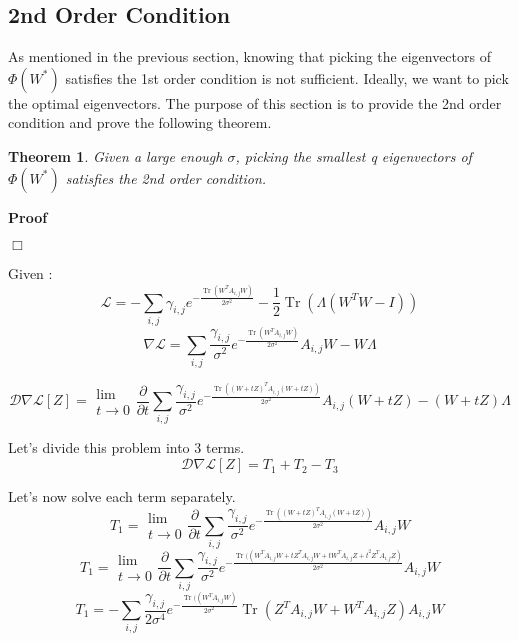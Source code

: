 \documentclass{article}
\newcommand{\nobracket}{}
\newcommand{\tmop}[1]{\ensuremath{\operatorname{#1}}}
\newenvironment{proof}{\noindent\textbf{Proof\ }}{\hspace*{\fill}$\Box$\medskip}
\newtheorem{theorem}{Theorem}
\begin{document}
\subsection{2nd Order Condition}



As mentioned in the previous section, knowing that picking the eigenvectors of
$\Phi ( W^{\ast})$ satisfies the 1st order condition is not sufficient.
Ideally, we want to pick the optimal eigenvectors. The purpose of this section
is to provide the 2nd order condition and prove the following theorem.



\begin{theorem}
  Given a large enough $\sigma$, picking the smallest q eigenvectors of $\Phi
  ( W^{\ast})$ satisfies the 2nd order condition.
\end{theorem}



\begin{proof}
  
\end{proof}

Given :
\[ \mathcal{L}= - \sum_{i, j} \gamma_{i, j} e^{- \frac{\tmop{Tr} (W^T A_{i,
   j} W)}{2 \sigma^2}} - \frac{1}{2} \tmop{Tr} ( \Lambda ( W^T W - I)) \]
\[ \nabla \mathcal{L}= \sum_{i, j} \frac{\gamma_{i, j}}{\sigma^2} e^{-
   \frac{\tmop{Tr} (W^T A_{i, j} W)}{2 \sigma^2}} A_{i, j} W - W \Lambda \]

\[ \mathcal{D} \nabla \mathcal{L} [ Z] = \begin{array}{l}
     \lim\\
     t \rightarrow 0
   \end{array} \frac{\partial}{\partial t} \sum_{i, j} \frac{\gamma_{i,
   j}}{\sigma^2} e^{- \frac{\tmop{Tr} ( ( W + t Z)^T A_{i, j}  ( W + t Z))}{2
   \sigma^2}} A_{i, j}  ( W + t Z) - ( W + t Z) \Lambda \]


Let's divide this problem into 3 terms.
\[ \mathcal{D} \nabla \mathcal{L} [ Z] = T_1 + T_2 - T_3 \]


Let's now solve each term separately.
\[ T_1 = \begin{array}{l}
     \lim\\
     t \rightarrow 0
   \end{array} \frac{\partial}{\partial t} \sum_{i, j} \frac{\gamma_{i,
   j}}{\sigma^2} e^{- \frac{\tmop{Tr} ( ( W + t Z)^T A_{i, j}  ( W + t Z))}{2
   \sigma^2}} A_{i, j} W \]
\[ T_1 = \begin{array}{l}
     \lim\\
     t \rightarrow 0
   \end{array} \frac{\partial}{\partial t} \sum_{i, j} \frac{\gamma_{i,
   j}}{\sigma^2} e^{- \frac{\tmop{Tr} ( ( W^T A_{i, j} W + t Z^T A_{i, j} W +
   t W^T A_{i, j} Z + t^2 Z^T A_{i, j} Z \nobracket)}{2 \sigma^2}} A_{i, j} W
\]
\[ T_1 = - \sum_{i, j} \frac{\gamma_{i, j}}{2 \sigma^4} e^{- \frac{\tmop{Tr} (
   ( W^T A_{i, j} W \nobracket)}{2 \sigma^2}} \tmop{Tr} ( Z^T A_{i, j} W + W^T
   A_{i, j} Z) A_{i, j} W \]
\end{document}
